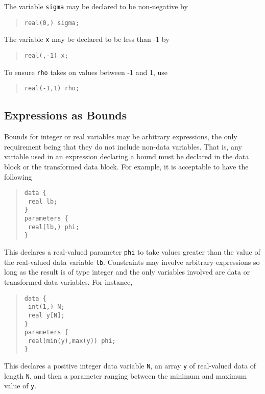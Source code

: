 \documentclass[10pt]{report}
\newcommand{\code}[1]{{\tt #1}}
\begin{document}
The variable \code{sigma} may be declared to be non-negative by
%
\begin{quote}
\begin{Verbatim}
real(0,) sigma;
\end{Verbatim}
\end{quote}
%
The variable \code{x} may be declared to be less than -1 by
%
\begin{quote}
\begin{Verbatim} 
real(,-1) x;
\end{Verbatim}
\end{quote}
% 
To ensure \code{rho} takes on values between -1 and 1, use
%
\begin{quote}
\begin{Verbatim}
real(-1,1) rho;
\end{Verbatim}
\end{quote}
%


\subsection{Expressions as Bounds}

Bounds for integer or real variables may be arbitrary expressions, the
only requirement being that they do not include non-data variables.
That is, any variable used in an expression declaring a bound must be
declared in the data block or the transformed data block.  For
example, it is acceptable to have the following
%
\begin{quote}
\begin{Verbatim}
data { 
 real lb;
}
parameters {
 real(lb,) phi;
}
\end{Verbatim}
\end{quote}
%
This declares a real-valued parameter \code{phi} to take values
greater than the value of the real-valued data variable \code{lb}.
Constraints may involve arbitrary expressions so long as the result is
of type integer and the only variables involved are data or
transformed data variables.  For instance,
\begin{quote}
\begin{Verbatim}
data { 
 int(1,) N;
 real y[N];
}
parameters {
 real(min(y),max(y)) phi;
}
\end{Verbatim}
\end{quote}
%
This declares a positive integer data variable \code{N}, an array \code{y} of
real-valued data of length \code{N}, and then a parameter ranging
between the minimum and maximum value of \code{y}.
\end{document}
